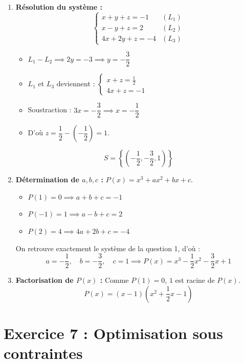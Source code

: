 \documentclass[12pt,a4paper]{article}
\begin{document}
\begin{enumerate}
    \item \textbf{Résolution du système :}
    \[
    \begin{cases}
    x + y + z = -1 & (L_1) \\
    x - y + z = 2 & (L_2) \\
    4x + 2y + z = -4 & (L_3)
    \end{cases}
    \]
    \begin{itemize}[label=$\bullet$]
        \item $L_1 - L_2 \implies 2y = -3 \implies y = -\dfrac{3}{2}$
        \item $L_1$ et $L_3$ deviennent : $\begin{cases} x + z = \frac{1}{2} \\ 4x + z = -1 \end{cases}$
        \item Soustraction : $3x = -\dfrac{3}{2} \implies x = -\dfrac{1}{2}$
        \item D'où $z = \dfrac{1}{2} - \left(-\dfrac{1}{2}\right) = 1$.
    \end{itemize}
    \[
    S = \left\{\left(-\frac{1}{2}, -\frac{3}{2}, 1\right)\right\}
    \]

    \item \textbf{Détermination de $a, b, c$ :}
    $P(x) = x^3 + ax^2 + bx + c$.
    \begin{itemize}[label=$\bullet$]
        \item $P(1) = 0 \implies a + b + c = -1$
        \item $P(-1) = 1 \implies a - b + c = 2$
        \item $P(2) = 4 \implies 4a + 2b + c = -4$
    \end{itemize}
    On retrouve exactement le système de la question 1, d'où :
    \[
    a = -\frac{1}{2}, \quad b = -\frac{3}{2}, \quad c = 1 \implies P(x) = x^3 - \frac{1}{2}x^2 - \frac{3}{2}x + 1
    \]

    \item \textbf{Factorisation de $P(x)$ :}
    Comme $P(1) = 0$, $1$ est racine de $P(x)$.
    \[
    P(x) = (x - 1)\left(x^2 + \frac{1}{2}x - 1\right)
    \]
\end{enumerate}

\vspace{0.3cm}

\section*{Exercice 7 : Optimisation sous contraintes}
\end{document}

